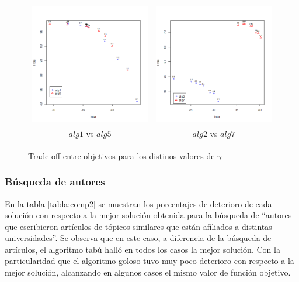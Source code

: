 \begin{figure}[H]
	\centering
	\begin{tabular}{cc}
			\includegraphics[width=0.45\linewidth]{img/alg1_vs_alg5.png}&
			\includegraphics[width=0.45\linewidth]{img/alg2_vs_alg7.png}\\
			$alg1$ vs $alg5$ & $alg2$ vs $alg7$\\
	\end{tabular}
	\caption{Trade-off entre objetivos para los distinos valores de $\gamma$}
	\label{res:inter_intra}
\end{figure}

\subsubsection{Búsqueda de autores}
En la tabla \ref{tabla:comp2} se muestran los porcentajes de deterioro de cada solución con respecto a la mejor solución obtenida para la búsqueda de ``autores que escribieron artículos de tópicos similares que están afiliados a distintas universidades''. Se observa que en este caso, a diferencia de la búsqueda de artículos, el algoritmo tabú halló en todos los casos la mejor solución. Con la particularidad que el algoritmo goloso tuvo muy poco deterioro con respecto a la mejor solución, alcanzando en algunos casos el mismo valor de función objetivo.

